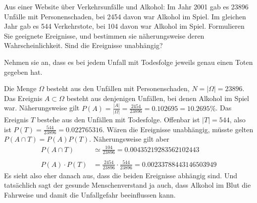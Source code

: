 Aus einer Website über Verkehrsunfälle und Alkohol: Im Jahr 2001
gab es 23896 Unfälle mit Personenschaden, bei 2454 davon war
Alkohol im Spiel. Im gleichen Jahr gab es 544 Verkehrstote, bei 104
davon war Alkohol im Spiel. Formulieren Sie geeignete Ereignisse, und
bestimmen sie näherungsweise deren Wahrscheinlichkeit. Sind die Ereignisse
unabhängig?


\begin{hinweis}
Nehmen sie an, dass es bei jedem Unfall mit Todesfolge jeweils
genau einen Toten gegeben hat.
\end{hinweis}

\begin{loesung}
Die Menge $\Omega$ besteht aus den Unfällen mit Personenschaden,
$N=|\Omega|=23896$. Das Ereignis $A\subset \Omega$ besteht aus denjenigen
Unfällen, bei denen Alkohol im Spiel war. Näherungsweise gilt $P(A)=\frac{|A|}{|\Omega|}=\frac{2454}{23896}=0.102695=10.2695\%$.
Das Ereignis $T$ bestehe aus den
Unfällen mit Todesfolge. Offenbar ist
$|T| = 544$, also ist $P(T) = \frac{544}{23896}=0.022765316$.
Wären die Ereignisse unabhängig, müsste gelten
$ P(A\cap T)=P(A)P(T) $. Näherungsweise gilt aber
\begin{align*}
P(A\cap T)&\simeq\frac{104}{23896}=0.00435219283562102443\\
\\
P(A)\cdot P(T)&=\frac{2454}{23896}\cdot\frac{544}{23896}=0.00233788443146503949
\end{align*}
Es sieht also eher danach aus, dass die beiden Ereignisse
abhängig sind. Und tatsächlich sagt der gesunde Menschenverstand ja auch,
dass Alkohol im Blut die Fahrweise und damit die Unfallgefahr beeinflussen
kann.
\end{loesung}


